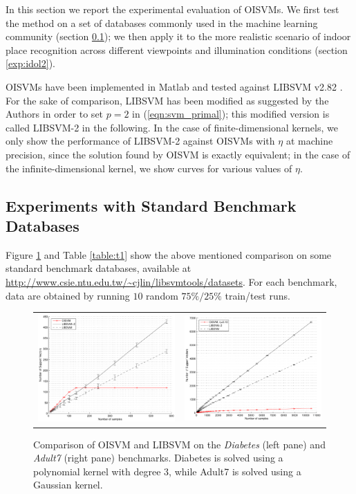 In this section we report the experimental evaluation of OISVMs. We
first test the method on a set of databases commonly used in the
machine learning community (section \ref{exp:ml}); we then apply it to
the more realistic scenario of indoor place recognition across
different viewpoints and illumination conditions (section
\ref{exp:idol2}).

OISVMs have been implemented in Matlab and tested against LIBSVM v2.82
\cite{ChangL01}. For the sake of comparison, LIBSVM has been modified
as suggested by the Authors in order to set $p=2$ in
(\ref{eqn:svm_primal}); this modified version is called LIBSVM-2 in
the following. In the case of finite-dimensional kernels, we only show
the performance of LIBSVM-2 against OISVMs with $\eta$ at machine
precision, since the solution found by OISVM is exactly equivalent; in
the case of the infinite-dimensional kernel, we show curves for
various values of $\eta$.

\subsection{Experiments with Standard Benchmark Databases}
\label{exp:ml}

Figure \ref{fig:ad7} and Table \ref{table:t1} show the above mentioned
comparison on some standard benchmark databases, available at
\url{http://www.csie.ntu.edu.tw/~cjlin/libsvmtools/datasets}.  For
each benchmark, data are obtained by running $10$ random $75\%/25\%$
train/test runs.

\begin{figure}[!ht]
  \centering \footnotesize
  \begin{tabular}{cc}
  \includegraphics[width=0.47\linewidth]{figs/results/finite_kernel.pdf} &
  \includegraphics[width=0.47\linewidth]{figs/results/adult7.pdf}
  \end{tabular}
  \caption{Comparison of OISVM and LIBSVM on the \emph{Diabetes}
  (left pane) and \emph{Adult7} (right pane) benchmarks. Diabetes is
  solved using a polynomial kernel with degree $3$, while Adult7 is
  solved using a Gaussian kernel.}
\label{fig:ad7}
\end{figure}

